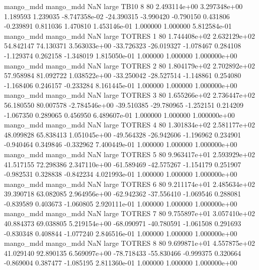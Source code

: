 mango_mdd mango_mdd                   NaN      large     TB10                 8 80 2.493114e+00   3.297348e+00      1.189593       1.239035 -8.747358e-02    -24.390315     -3.990420    -0.790150       0.431806 -0.239891   0.811036     1.470810   1.453146e-01            1.000000        1.000000        5.812584e-01
mango_mdd mango_mdd                   NaN      large   TOTRES                 1 80 1.744408e+02   2.632129e+02     54.842147      74.130371  3.563033e+00    -33.726323    -26.019327    -1.078467       0.284108 -1.129374   0.262158    -1.348019   1.815050e-01            1.000000        1.000000        1.000000e+00
mango_mdd mango_mdd                   NaN      large   TOTRES                 2 80 1.804179e+02   2.702892e+02     57.958984      81.092722  1.038522e+00    -33.250042    -28.527514    -1.148861       0.254080 -1.168406   0.246157    -0.233284   8.161445e-01            1.000000        1.000000        1.000000e+00
mango_mdd mango_mdd                   NaN      large   TOTRES                 3 80 1.655266e+02   2.736447e+02     56.180550      80.007578 -2.784546e+00    -39.510385    -29.780965    -1.252151       0.214209 -1.067350   0.289065     0.456950   6.489607e-01            1.000000        1.000000        1.000000e+00
mango_mdd mango_mdd                   NaN      large   TOTRES                 4 80 1.301834e+02   2.581177e+02     48.099828      65.838413  1.051045e+00    -49.564328    -26.942606    -1.196962       0.234901 -0.940464   0.349846    -0.332962   7.400449e-01            1.000000        1.000000        1.000000e+00
mango_mdd mango_mdd                   NaN      large   TOTRES                 5 80 9.963417e+01   2.593929e+02     41.517155      72.298386  2.347110e+00    -61.589469    -42.575267    -1.154179       0.251907 -0.982531   0.328838    -0.842234   4.021993e-01            1.000000        1.000000        1.000000e+00
mango_mdd mango_mdd                   NaN      large   TOTRES                 6 80 9.211174e+01   2.485634e+02     39.390718      63.082085  2.964956e+00    -62.942362    -37.556410    -1.069546       0.288081 -0.839589   0.403673    -1.060805   2.920111e-01            1.000000        1.000000        1.000000e+00
mango_mdd mango_mdd                   NaN      large   TOTRES                 7 80 9.755897e+01   3.057410e+02     40.884373      69.038805  5.219154e+00    -68.090971    -40.780591    -1.061508       0.291693 -0.830348   0.408844    -1.077240   2.846516e-01            1.000000        1.000000        1.000000e+00
mango_mdd mango_mdd                   NaN      large   TOTRES                 8 80 9.699871e+01   4.557875e+02     41.029140      92.890135  6.569097e+00    -78.718433    -55.830466    -0.999375       0.320664 -0.869004   0.387477    -1.085195   2.811360e-01            1.000000        1.000000        1.000000e+00
